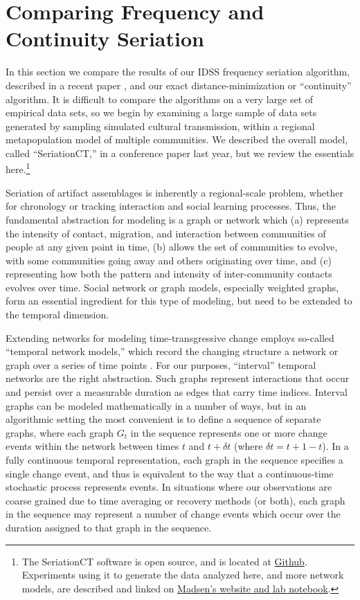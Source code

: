 \documentclass[graybox,natbib]{svmult}
\begin{document}
\section{Comparing Frequency and Continuity
Seriation}\label{comparing-frequency-and-continuity-seriation}

In this section we compare the results of our IDSS frequency seriation
algorithm, described in a recent paper \citep{lipomadsendunnell2015},
and our exact distance-minimization or ``continuity'' algorithm. It is
difficult to compare the algorithms on a very large set of empirical
data sets, so we begin by examining a large sample of data sets
generated by sampling simulated cultural transmission, within a regional
metapopulation model of multiple communities. We described the overall
model, called ``SeriationCT,'' in a conference paper last year, but we
review the essentials here.\footnote{The SeriationCT software is open
  source, and is located at
  \href{https://github.com/mmadsen/seriationct}{Github}. Experiments
  using it to generate the data analyzed here, and more network models,
  are described and linked on
  \href{http://notebook.madsenlab.org}{Madsen's website and lab
  notebook}.}

Seriation of artifact assemblages is inherently a regional-scale
problem, whether for chronology or tracking interaction and social
learning processes. Thus, the fundamental abstraction for modeling is a
graph or network which (a) represents the intensity of contact,
migration, and interaction between communities of people at any given
point in time, (b) allows the set of communities to evolve, with some
communities going away and others originating over time, and (c)
representing how both the pattern and intensity of inter-community
contacts evolves over time. Social network or graph models, especially
weighted graphs, form an essential ingredient for this type of modeling,
but need to be extended to the temporal dimension.

Extending networks for modeling time-transgressive change employs
so-called ``temporal network models,'' which record the changing
structure a network or graph over a series of time points
\citep{Holme2012}. For our purposes, ``interval'' temporal networks are
the right abstraction. Such graphs represent interactions that occur and
persist over a measurable duration as edges that carry time indices.
Interval graphs can be modeled mathematically in a number of ways, but
in an algorithmic setting the most convenient is to define a sequence of
separate graphs, where each graph \(G_t\) in the sequence represents one
or more change events within the network between times \(t\) and
\(t + \delta t\) (where \(\delta t = t+1 - t\)). In a fully continuous
temporal representation, each graph in the sequence specifies a single
change event, and thus is equivalent to the way that a continuous-time
stochastic process represents events. In situations where our
observations are coarse grained due to time averaging or recovery
methods (or both), each graph in the sequence may represent a number of
change events which occur over the duration assigned to that graph in
the sequence.
\end{document}
